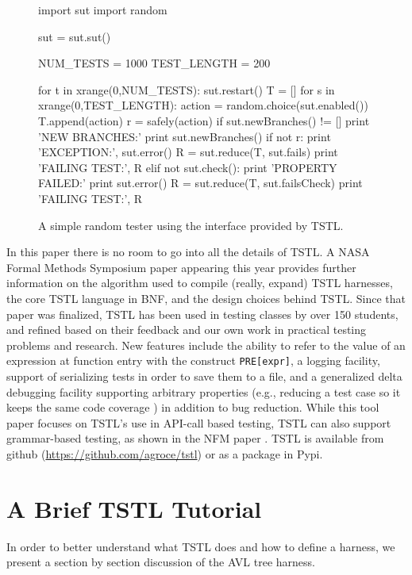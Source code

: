 \documentclass{sig-alternate}
\begin{document}
\begin{figure}
\begin{code}
import sut
import random

sut = sut.sut()

NUM\_TESTS = 1000
TEST\_LENGTH = 200 

for t in xrange(0,NUM\_TESTS):
   sut.restart()
   T = []
   for s in xrange(0,TEST\_LENGTH): 
       action = random.choice(sut.enabled())
       T.append(action)
       r = safely(action)
       if sut.newBranches() != []
          print 'NEW BRANCHES:'
          print sut.newBranches()
       if not r:
          print 'EXCEPTION:', sut.error() 
          R = sut.reduce(T, sut.fails) 
          print 'FAILING TEST:', R
       elif not sut.check():
          print 'PROPERTY FAILED:'
          print sut.error()  
          R = sut.reduce(T, sut.failsCheck) 
          print 'FAILING TEST:', R
\end{code}
\caption{A simple random tester using the interface provided by TSTL.}
\label{fig:rt}
\end{figure}

In this paper there is no room to go into all the details of TSTL.  A
NASA Formal Methods Symposium paper \cite{NFM15} appearing this year
provides further information on the algorithm used to compile
(really, expand) TSTL harnesses, the core TSTL language in BNF, and
the design choices behind TSTL.  Since that paper was finalized, TSTL
has been used in testing classes by over 150 students, and refined
based on their feedback and our own work in practical testing problems
and research.  New features include the ability to refer to the value
of an expression at function entry with the construct {\tt PRE[expr]},
a logging facility, support of serializing tests in order to save them
to a file, and a generalized delta debugging \cite{DD}
facility supporting arbitrary properties (e.g., reducing a test case
so it keeps the same code coverage \cite{icst2014}) in addition to bug
reduction.  While this tool paper focuses on TSTL's use in API-call
based testing, TSTL can also support grammar-based testing, as shown
in the NFM paper \cite{NFM15}.  TSTL is available from github
(\url{https://github.com/agroce/tstl}) or as a package in Pypi.

\section{A Brief TSTL Tutorial}

In order to better understand what TSTL does and how to define a
harness,  we present a section by section discussion of the AVL tree harness.
\end{document}

